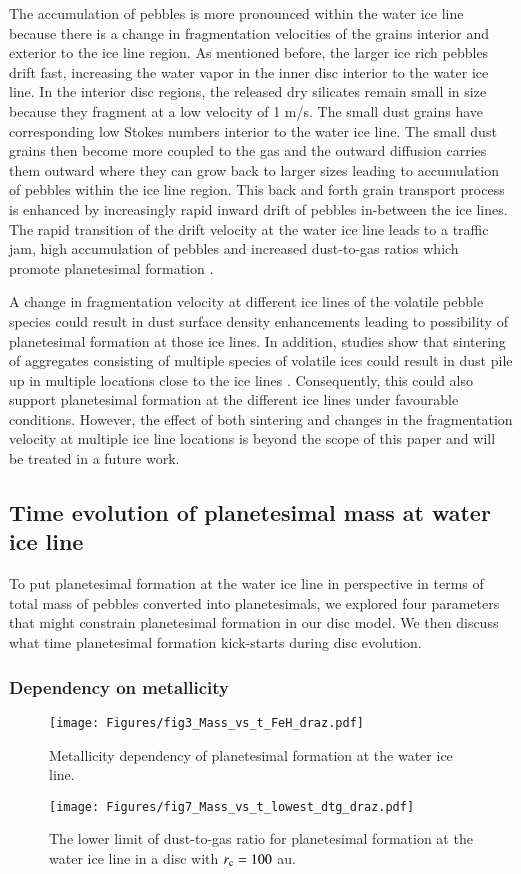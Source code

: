 \documentclass{aa}
\begin{document}
The accumulation of pebbles is more pronounced within the water ice line because there is a change in fragmentation velocities of the grains interior and exterior to the ice line region. As mentioned before, the larger ice rich pebbles drift fast, increasing the water vapor in the inner disc interior to the water ice line.  In the interior disc regions, the released dry silicates remain small in size because they fragment at a low velocity of 1 m/s. The small dust grains have corresponding low  Stokes numbers interior to the water ice line.
The small dust grains then become more coupled to the gas and the outward diffusion carries them outward where they can grow back to larger sizes leading to accumulation of pebbles within the ice line region.  This back and forth grain transport process is enhanced by increasingly rapid inward drift of pebbles in-between the ice lines. The rapid transition of the drift velocity at the water ice line leads to a traffic jam, high accumulation of pebbles and increased dust-to-gas ratios which promote planetesimal formation \citep{DrazkowskaAlibert2017}.

A change in fragmentation velocity at different ice lines of the volatile pebble species could result in dust surface density enhancements \citep{Pinilla2017} leading to possibility of planetesimal formation at those ice lines. In addition, studies show that sintering of aggregates consisting of multiple species of volatile ices could result in dust pile up in multiple locations close to the ice lines \citep{Okuzumi2016}. Consequently, this could also support planetesimal formation at the different ice lines under favourable conditions. However, the effect of both sintering and changes in the fragmentation velocity at multiple ice line locations is beyond the scope of this paper and will be treated in a future work.

\subsection{Time evolution of planetesimal mass at water ice line}\label{sec_mass_vs_time}
To put planetesimal formation at the water ice line in perspective in terms of total mass of pebbles  converted into planetesimals, we explored four parameters that might constrain planetesimal formation in our disc model. We then discuss what time planetesimal formation kick-starts during disc evolution.
\subsubsection{Dependency on metallicity}
\begin{figure}
   \texttt{[image: Figures/fig3\_Mass\_vs\_t\_FeH\_draz.pdf]}
   \caption{Metallicity dependency of planetesimal formation at the water ice line.}
   \label{fig:fig3}
\end{figure}
\begin{figure}
   \texttt{[image: Figures/fig7\_Mass\_vs\_t\_lowest\_dtg\_draz.pdf]}
   \caption{The lower limit of dust-to-gas ratio for planetesimal formation at the water ice line in a disc with $r_{\rm c}=100$ au.}
   \label{fig:fig7}
\end{figure}
\end{document}
